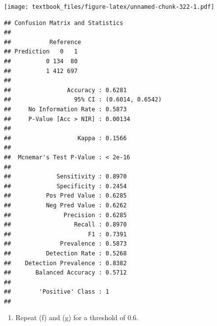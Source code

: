 \documentclass[
  11pt,
]{book}
\newenvironment{Shaded}{\begin{snugshade}}{\end{snugshade}}
\newcommand{\AttributeTok}[1]{\textcolor[rgb]{0.77,0.63,0.00}{#1}}
\newcommand{\FunctionTok}[1]{\textcolor[rgb]{0.00,0.00,0.00}{#1}}
\newcommand{\NormalTok}[1]{#1}
\newcommand{\SpecialCharTok}[1]{\textcolor[rgb]{0.00,0.00,0.00}{#1}}
\newcommand{\StringTok}[1]{\textcolor[rgb]{0.31,0.60,0.02}{#1}}
\providecommand{\tightlist}{%
  \setlength{\itemsep}{0pt}\setlength{\parskip}{0pt}}
\theoremstyle{definition}
\theoremstyle{definition}
\theoremstyle{definition}
\theoremstyle{definition}
\theoremstyle{remark}
\begin{document}
\texttt{[image: textbook\_files/figure-latex/unnamed-chunk-322-1.pdf]}

\newpage

\begin{Shaded}
\end{Shaded}

\begin{verbatim}
## Confusion Matrix and Statistics
## 
##           Reference
## Prediction   0   1
##          0 134  80
##          1 412 697
##                                           
##                Accuracy : 0.6281          
##                  95% CI : (0.6014, 0.6542)
##     No Information Rate : 0.5873          
##     P-Value [Acc > NIR] : 0.00134         
##                                           
##                   Kappa : 0.1566          
##                                           
##  Mcnemar's Test P-Value : < 2e-16         
##                                           
##             Sensitivity : 0.8970          
##             Specificity : 0.2454          
##          Pos Pred Value : 0.6285          
##          Neg Pred Value : 0.6262          
##               Precision : 0.6285          
##                  Recall : 0.8970          
##                      F1 : 0.7391          
##              Prevalence : 0.5873          
##          Detection Rate : 0.5268          
##    Detection Prevalence : 0.8382          
##       Balanced Accuracy : 0.5712          
##                                           
##        'Positive' Class : 1               
## 
\end{verbatim}

\newpage

\begin{enumerate}
\def\labelenumi{(\roman{enumi})}
\tightlist
\item
  Repeat (f) and (g) for a threshold of 0.6.
\end{enumerate}
\end{document}
